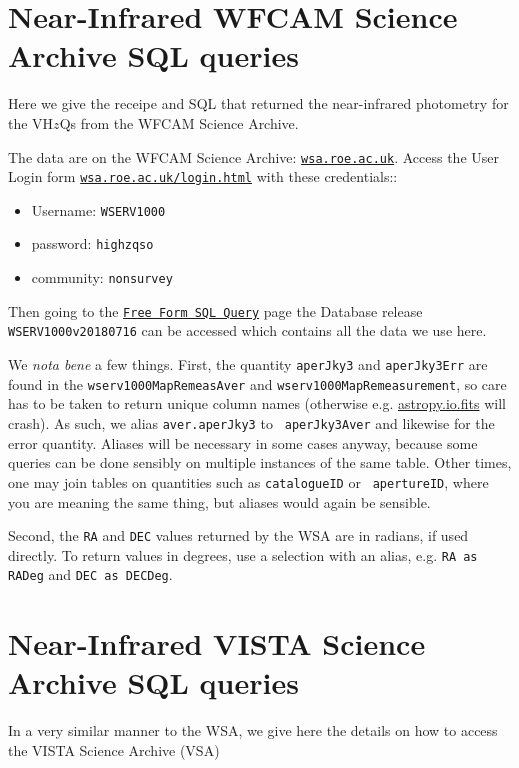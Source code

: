 \documentclass[usenatbib]{mnras}
\begin{document}


\appendix


\section{Near-Infrared WFCAM Science Archive SQL queries}\label{sec:SQL}
Here we give the receipe and SQL that returned the near-infrared photometry 
for the VH$z$Qs from the  WFCAM Science Archive. 

The data are on the WFCAM Science Archive: \href{wsa.roe.ac.uk}{\tt wsa.roe.ac.uk}. 
Access the User Login form \href{WFCAM Science Archive}{\tt wsa.roe.ac.uk/login.html} 
with these credentials::
\begin{itemize}
    \item Username: {\tt WSERV1000} 
    \item password: {\tt highzqso} 
    \item community: {\tt nonsurvey}
\end{itemize}
Then going to the
\href{http://wsa.roe.ac.uk:8080/wsa/SQL_form.jsp}{{\tt Free Form SQL
Query}} page the Database release {\tt WSERV1000v20180716} can be
accessed which contains all the data we use here.

We {\it nota bene} a few things. First, the quantity {\tt aperJky3}
and {\tt aperJky3Err} are found in the {\tt wserv1000MapRemeasAver}
and {\tt wserv1000MapRemeasurement}, so care has to be taken to return
unique column names (otherwise e.g.
\href{http://docs.astropy.org/en/stable/io/fits/}{astropy.io.fits}
will crash).  As such, we alias {\tt aver.aperJky3} to {\tt
aperJky3Aver} and likewise for the error quantity. Aliases will be
necessary in some cases anyway, because some queries can be done
sensibly on multiple instances of the same table. Other times, one may
join tables on quantities such as {\tt catalogueID} or {\tt
apertureID}, where you are meaning the same thing, but aliases would
again be sensible.

Second, the {\tt RA} and {\tt DEC} values returned by the WSA are in radians, if
used directly. To return values in degrees, use a selection with an alias, e.g. 
{\tt RA as RADeg} and {\tt DEC as DECDeg}.

\onecolumn

\twocolumn


\section{Near-Infrared VISTA Science Archive SQL queries}\label{sec:SQL}
In a very similar manner to the WSA, we give here the details on how to access
the VISTA Science Archive (VSA)
\end{document}
